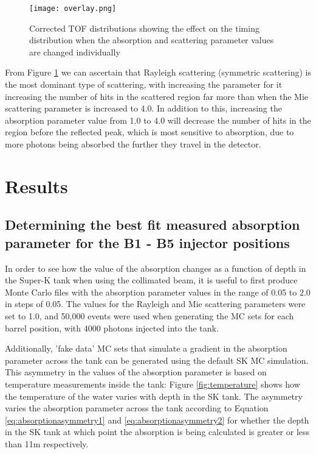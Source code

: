 \documentclass[11pt,oneside,a4paper]{article}
\begin{document}
\begin{figure}[htbp]
	\centering
	\texttt{[image: overlay.png]}
	\caption{Corrected TOF distributions showing the effect on the timing distribution when the absorption and scattering parameter values are changed individually}
	\label{fig:overlay}
\end{figure}	
	
	
From Figure \ref{fig:overlay} we can ascertain that Rayleigh scattering (symmetric scattering) is the most dominant type of scattering, with increasing the parameter for it increasing the number of hits in the scattered region far more than when the Mie scattering parameter is increased to 4.0. In addition to this, increasing the absorption parameter value from 1.0 to 4.0 will decrease the number of hits in the region before the reflected peak, which is most sensitive to absorption, due to more photons being absorbed the further they travel in the detector.
\newpage
\section{Results}
\subsection{Determining the best fit measured absorption parameter for the B1 - B5 injector positions} 	
In order to see how the value of the absorption changes as a function of depth in the Super-K tank when using the collimated beam, it is useful to first produce Monte Carlo files with the absorption parameter values in the range of 0.05 to 2.0 in steps of 0.05. The values for the Rayleigh and Mie scattering parameters were set to 1.0, and 50,000 events were used when generating the MC sets for each barrel position, with 4000 photons injected into the tank.

Additionally, 'fake data' MC sets that simulate a gradient in the absorption parameter across the tank can be generated using the default SK MC simulation. This asymmetry in the values of the absorption parameter is based on temperature measurements inside the tank: Figure \ref{fig:temperature} shows how the temperature of the water varies with depth in the SK tank. The asymmetry varies the absorption parameter across the tank according to Equation \ref{eq:absorptionasymmetry1} and \ref{eq:absorptionasymmetry2} for whether the depth in the SK tank at which point the absorption is being calculated is greater or less than 11m respectively. 
\end{document}
